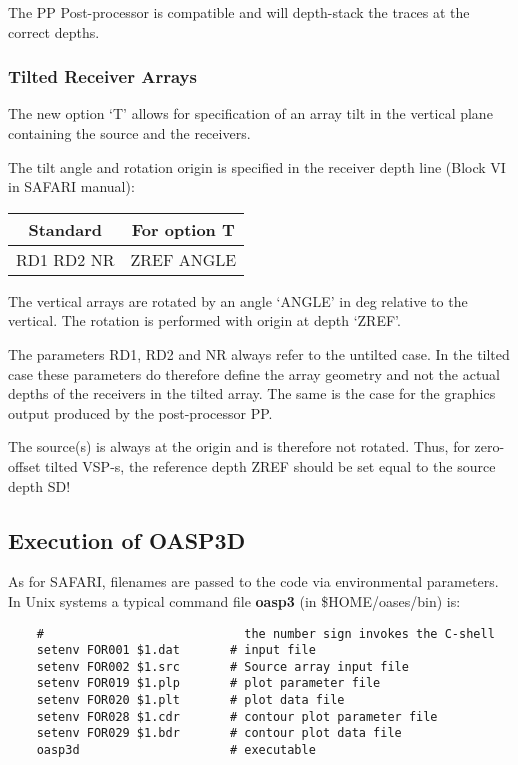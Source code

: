 The PP Post-processor is compatible and will depth-stack the traces at
the correct depths.

\subsubsection{Tilted Receiver Arrays}

The new option `T' allows for specification of an array tilt in the
vertical plane containing the source and the receivers.

The tilt angle and rotation origin is specified in the receiver depth
line (Block VI in SAFARI manual):

\begin{tabular}{cc}
   Standard   &    For option T \\ \hline
RD1 RD2 NR &  ZREF  ANGLE
\end{tabular}


The vertical arrays are rotated by an angle `ANGLE' in deg relative
to the vertical. The rotation is performed with origin at depth `ZREF'.

The parameters RD1, RD2 and NR always refer to the untilted case. 
In the tilted case these parameters do therefore define the array
geometry and not the actual depths of the receivers in the tilted array.
The same is the case for the graphics output produced by the
post-processor PP. 


The source(s) is always at the origin and is therefore not rotated.
Thus, for zero-offset tilted VSP-s, the reference depth ZREF should be set 
equal to the source depth SD!



\subsection{Execution of OASP3D}

    As  for  SAFARI,  filenames  are  passed  to  the  code   via 
environmental parameters. In Unix systems a typical command  file 
{\bf oasp3} (in  \$HOME/oases/bin) is:

\small
\begin{verbatim}
    #                            the number sign invokes the C-shell 
    setenv FOR001 $1.dat       # input file 
    setenv FOR002 $1.src       # Source array input file
    setenv FOR019 $1.plp       # plot parameter file
    setenv FOR020 $1.plt       # plot data file  
    setenv FOR028 $1.cdr       # contour plot parameter file 
    setenv FOR029 $1.bdr       # contour plot data file 
    oasp3d                     # executable
\end{verbatim}
\normalsize

